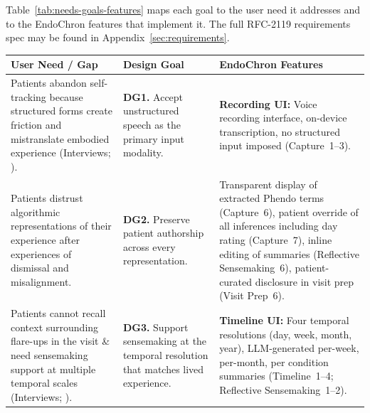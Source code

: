 Table~\ref{tab:needs-goals-features} maps each goal to the user need it addresses and to the EndoChron features that implement it. The full RFC-2119 requirements spec may be found in Appendix~\ref{sec:requirements}.

\begin{table}[H]
  \centering
  \footnotesize
  \renewcommand{\arraystretch}{1.5}
  \begin{tabular}{p{}|p{}:p{0.33\textwidth}}
    \hline
    \textbf{User Need / Gap}                                                                                                                                             & \textbf{Design Goal}                                                                        & \textbf{EndoChron Features}                                                                                                                                                                                                                                                                                                                      \\
    \hline
    \hline
    Patients abandon self-tracking because structured forms create friction and mistranslate embodied experience (Interviews; \cite{McKillop2019Thesis}).                & \textbf{DG1.} Accept unstructured speech as the primary input modality.                     & \textbf{Recording UI:} Voice recording interface, on-device transcription, no structured input imposed \textcolor{phendopink}{(Capture~1--3)}.                                                                                                                                                                                                   \\
    \hline
    Patients distrust algorithmic representations of their experience after experiences of dismissal and misalignment\cite{Pichon2025Betrayal,Ballard2006Endometriosis}. & \textbf{DG2.} Preserve patient authorship across every representation.                      & Transparent display of extracted Phendo terms \textcolor{phendopink}{(Capture~6)}, patient override of all inferences including day rating \textcolor{phendopink}{(Capture~7)}, inline editing of summaries \textcolor{phendopink}{(Reflective Sensemaking~6)}, patient-curated disclosure in visit prep \textcolor{phendopink}{(Visit Prep~6)}. \\
    \hline
    Patients cannot recall context surrounding flare-ups in the visit \& need sensemaking support at multiple temporal scales (Interviews; \cite{Pichon2021Divided}).    & \textbf{DG3.} Support sensemaking at the temporal resolution that matches lived experience. & \textbf{Timeline UI:} Four temporal resolutions (day, week, month, year), LLM-generated per-week, per-month, per condition summaries \textcolor{phendopink}{(Timeline~1--4; Reflective Sensemaking~1--2)}.                                                                                                                                       \\

\end{tabular}
\end{table}
